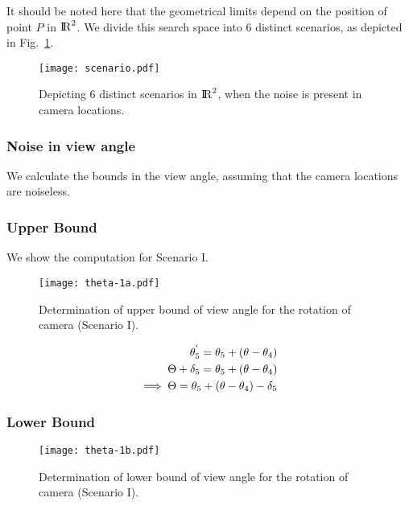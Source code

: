It should be noted here that the geometrical limits depend on the position of point $P$ in ${\rm I\!R}^{2}$. We divide this search space into $6$ distinct scenarios, as depicted in Fig.~\ref{fig:scene}. 

\begin{figure}[htb]
\centering
\texttt{[image: scenario.pdf]} 
\caption{Depicting $6$ distinct scenarios in ${\rm I\!R}^{2}$, when the noise is present in camera locations.}
\label{fig:scene}
\end{figure}

\subsubsection{Noise in view angle}
We calculate the bounds in the view angle, assuming that the camera locations are noiseless.

\subsubsection{Upper Bound}
We show the computation for Scenario I. 
\begin{figure}[htb]
\centering
\texttt{[image: theta-1a.pdf]} 
\caption[Determination of upper bound of view angle for the rotation of camera.]{Determination of upper bound of view angle for the rotation of camera (Scenario I).}
\end{figure}

\begin{equation}
\centering
\begin{aligned}
\theta_5^{'} = \theta_5 + (\theta - \theta_4)\\
\Theta + \delta_5 = \theta_5 + (\theta - \theta_4)\\
\implies \Theta = \theta_5 + (\theta - \theta_4) - \delta_5
\end{aligned}
\end{equation}

\subsubsection{Lower Bound}

\begin{figure}[htb]
\centering
\texttt{[image: theta-1b.pdf]} 
\caption[Determination of lower bound of view angle for the rotation of camera.]{Determination of lower bound of view angle for the rotation of camera (Scenario I).}
\end{figure}

